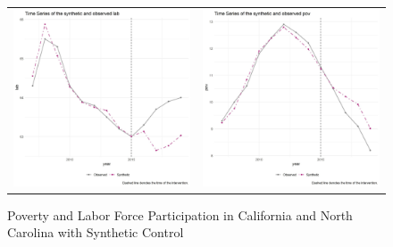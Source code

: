 \documentclass{article}
\begin{document}

\begin{figure}
\begin{center}
\caption{Poverty and Labor Force Participation in California and North Carolina with Synthetic Control}
\label{fig:series}{}
\begin{tabular}{cc}
 \includegraphics[width=80mm]{ca_lab_trend} &   \includegraphics[width=80mm]{ca_pov_trend} \\

\end{tabular}
\end{center}
\end{figure}
\end{document}
